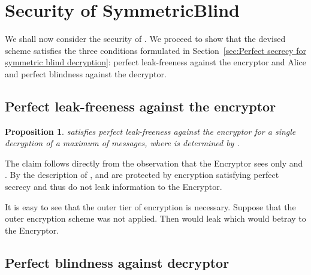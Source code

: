 \documentclass[10pt,journal]{IEEEtran}
\newtheorem{proposition}{Proposition}[section]
\begin{document}
\section{Security of SymmetricBlind}
\label{sec:Security of devised scheme}

We shall now consider the security of . We proceed to show that the devised
scheme satisfies the three conditions formulated in Section~\ref{sec:Perfect secrecy for symmetric blind decryption}:
perfect leak-freeness against the encryptor and Alice and perfect blindness against the decryptor.

\subsection{Perfect leak-freeness against the encryptor}

\begin{proposition}
 satisfies perfect leak-freeness against the encryptor for a single decryption
of a maximum of  messages, where  is determined by .
\end{proposition}
\begin{IEEEproof}
The claim follows directly from the observation that the Encryptor sees only  and . By the description
of , 
and  are protected by encryption satisfying perfect secrecy and thus do not
leak information to the Encryptor.
\end{IEEEproof}

It is easy to see that the outer tier of encryption is necessary.
Suppose that the outer encryption scheme was not applied. Then 
would leak  which would betray  to the Encryptor.

\subsection{Perfect blindness against decryptor}
\end{document}

